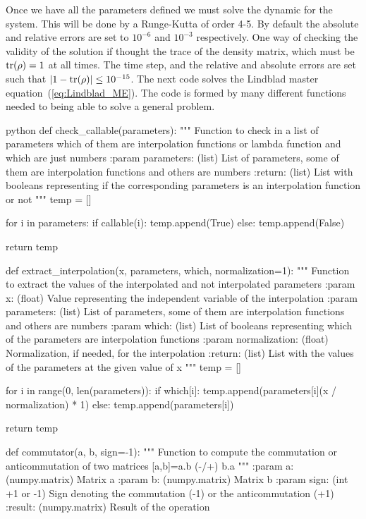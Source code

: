 Once we have all the parameters defined we must solve the dynamic for the system. This will be done by a Runge-Kutta of order 4-5. By default the absolute and relative errors are set to $10^{-6}$ and $10^{-3}$ respectively. One way of checking the validity of the solution if thought the trace of the density matrix, which must be $\tr(\rho)=1$ at all times. The time step, and the relative and absolute errors are set such that $\abs{1-\tr(\rho)}\leq 10^{-15}$. The next code solves the Lindblad master equation~(\ref{eq:Lindblad_ME}). The code is formed by many different functions needed to being able to solve a general problem.
\begin{mintedbox}{python}
def check_callable(parameters):
	"""
	Function to check in a list of parameters which of them are interpolation functions or lambda function and which are just numbers
	:param parameters: (list) List of parameters, some of them are interpolation functions and others are numbers
	:return: (list) List with booleans representing if the corresponding parameters is an interpolation function or not
	"""
	temp = []

	for i in parameters:
		if callable(i):
			temp.append(True)
		else:
			temp.append(False)

	return temp
	
def extract_interpolation(x, parameters, which, normalization=1):
	"""
	Function to extract the values of the interpolated and not interpolated parameters
	:param x: (float) Value representing the independent variable of the interpolation
	:param parameters: (list) List of parameters, some of them are interpolation functions and others are numbers
	:param which: (list) List of booleans representing which of the parameters are interpolation functions
	:param normalization: (float) Normalization, if needed, for the interpolation
	:return: (list) List with the values of the parameters at the given value of x
	"""
	temp = []

	for i in range(0, len(parameters)):
		if which[i]:
			temp.append(parameters[i](x / normalization) * 1)
		else:
			temp.append(parameters[i])

		return temp
	
def commutator(a, b, sign=-1):
	"""
	Function to compute the commutation or anticommutation of two matrices [a,b]=a.b (-/+) b.a 
	"""
	:param a: (numpy.matrix) Matrix a
	:param b: (numpy.matrix) Matrix b
	:param sign: (int +1 or -1) Sign denoting the commutation (-1)  or the anticommutation (+1)
	:result: (numpy.matrix) Result of the operation
	

\end{mintedbox}

